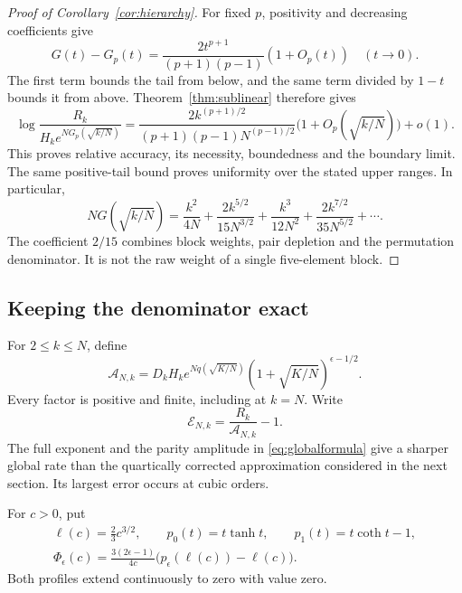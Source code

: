 \begin{proof}[Proof of Corollary~\ref{cor:hierarchy}]
For fixed $p$, positivity and decreasing coefficients give
\[
G(t)-G_p(t)=\frac{2t^{p+1}}{(p+1)(p-1)}(1+O_p(t))
\quad(t\to0).
\]
The first term bounds the tail from below, and the same term divided by $1-t$ bounds it from above. Theorem~\ref{thm:sublinear} therefore gives
\[
\log\frac{R_k}{H_ke^{NG_p(\sqrt{k/N})}}
=\frac{2k^{(p+1)/2}}{(p+1)(p-1)N^{(p-1)/2}}
\bigl(1+O_p(\sqrt{k/N})\bigr)+o(1).
\]
This proves relative accuracy, its necessity, boundedness and the boundary limit. The same positive-tail bound proves uniformity over the stated upper ranges. In particular,
\[
NG(\sqrt{k/N})
=\frac{k^2}{4N}+\frac{2k^{5/2}}{15N^{3/2}}
+\frac{k^3}{12N^2}+\frac{2k^{7/2}}{35N^{5/2}}+\cdots.
\]
The coefficient $2/15$ combines block weights, pair depletion and the permutation denominator. It is not the raw weight of a single five-element block.
\end{proof}

\subsection{Keeping the denominator exact}

For $2\le k\le N$, define
\begin{equation}\label{eq:globalformula}
\mathcal A_{N,k}
=D_kH_k e^{Nq(\sqrt{K/N})}
(1+\sqrt{K/N})^{\epsilon-1/2}.
\end{equation}
Every factor is positive and finite, including at $k=N$. Write
\[
\mathcal E_{N,k}=\frac{R_k}{\mathcal A_{N,k}}-1.
\]
The full exponent and the parity amplitude in \eqref{eq:globalformula} give a sharper global rate than the quartically corrected approximation considered in the next section. Its largest error occurs at cubic orders.

For $c>0$, put
\begin{equation}\label{eq:globalprofiledef}
\begin{gathered}
\ell(c)=\frac23c^{3/2},\qquad
p_0(t)=t\tanh t,\qquad p_1(t)=t\coth t-1,\\
\Phi_\epsilon(c)=\frac{3(2\epsilon-1)}{4c}
\bigl(p_\epsilon(\ell(c))-\ell(c)\bigr).
\end{gathered}
\end{equation}
Both profiles extend continuously to zero with value zero.

